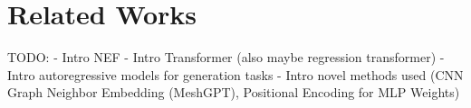 \section{Related Works}
\label{sec:literature}

TODO:
- Intro NEF
- Intro Transformer (also maybe regression transformer)
- Intro autoregressive models for generation tasks
- Intro novel methods used (CNN Graph Neighbor Embedding (MeshGPT), Positional Encoding for MLP Weights)